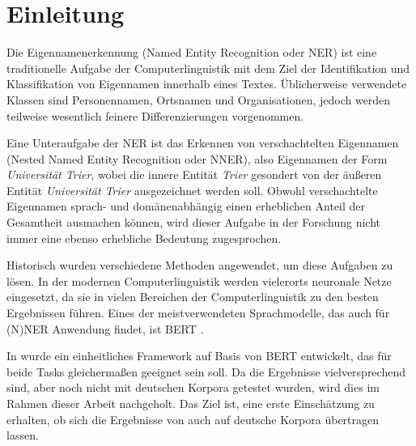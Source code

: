 

\chapter{Einleitung}
\label{ch:Einleitung}

Die Eigennamenerkennung (Named Entity Recognition oder NER) ist eine traditionelle Aufgabe der Computerlinguistik mit dem Ziel der Identifikation und Klassifikation von Eigennamen innerhalb eines Textes. Üblicherweise verwendete Klassen sind Personennamen, Ortsnamen und Organisationen, jedoch werden teilweise wesentlich feinere Differenzierungen vorgenommen.

Eine Unteraufgabe der NER ist das Erkennen von verschachtelten Eigennamen (Nested Named Entity Recognition oder NNER), also Eigennamen der Form \emph{Universität Trier}, wobei die innere Entität \emph{Trier} gesondert von der äußeren Entität \emph{Universität Trier} ausgezeichnet werden soll. Obwohl verschachtelte Eigennamen sprach- und domänenabhängig einen erheblichen Anteil der Gesamtheit ausmachen können, wird dieser Aufgabe in der Forschung nicht immer eine ebenso erhebliche Bedeutung zugesprochen.

Historisch wurden verschiedene Methoden angewendet, um diese Aufgaben zu lösen. In der modernen Computerlinguistik werden vielerorts neuronale Netze eingesetzt, da sie in vielen Bereichen der Computerlinguistik zu den besten Ergebnissen führen. Eines der meistverwendeten Sprachmodelle, das auch für (N)NER Anwendung findet, ist BERT \parencite{devlin2019bert}.

In \cite{li2019unified} wurde ein einheitliches Framework auf Basis von BERT entwickelt, das für beide Tasks gleichermaßen geeignet sein soll. Da die Ergebnisse vielversprechend sind, aber noch nicht mit deutschen Korpora getestet wurden, wird dies im Rahmen dieser Arbeit nachgeholt. Das Ziel ist, eine erste Einschätzung zu erhalten, ob sich die Ergebnisse von  auch auf deutsche Korpora übertragen lassen.

